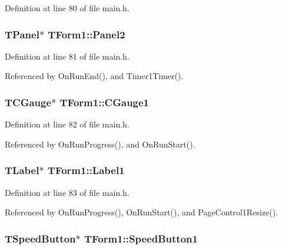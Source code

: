 Definition at line 80 of file main.h.\hypertarget{classTForm1_1c581dd73461c34e5408cd163f026386}{
\subsubsection[Panel2]{\setlength{\rightskip}{0pt plus 5cm}TPanel$\ast$ {\bf TForm1::Panel2}}}
\label{classTForm1_1c581dd73461c34e5408cd163f026386}




Definition at line 81 of file main.h.

Referenced by OnRunEnd(), and Timer1Timer().\hypertarget{classTForm1_3d74c84c60d687c60511fe44a7f04514}{
\subsubsection[CGauge1]{\setlength{\rightskip}{0pt plus 5cm}TCGauge$\ast$ {\bf TForm1::CGauge1}}}
\label{classTForm1_3d74c84c60d687c60511fe44a7f04514}




Definition at line 82 of file main.h.

Referenced by OnRunProgress(), and OnRunStart().\hypertarget{classTForm1_c5a132daa716561ea42ea51c60c952e1}{
\subsubsection[Label1]{\setlength{\rightskip}{0pt plus 5cm}TLabel$\ast$ {\bf TForm1::Label1}}}
\label{classTForm1_c5a132daa716561ea42ea51c60c952e1}




Definition at line 83 of file main.h.

Referenced by OnRunProgress(), OnRunStart(), and PageControl1Resize().\hypertarget{classTForm1_4910802fa9b4883b9e3991db1015c7ab}{
\subsubsection[SpeedButton1]{\setlength{\rightskip}{0pt plus 5cm}TSpeedButton$\ast$ {\bf TForm1::SpeedButton1}}}
\label{classTForm1_4910802fa9b4883b9e3991db1015c7ab}




